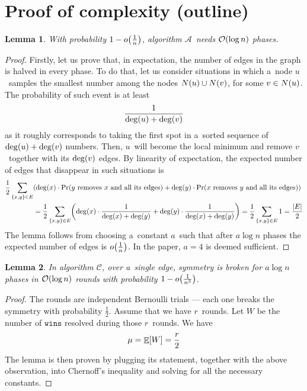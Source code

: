 \documentclass{article}
\newtheorem{lemma}{Lemma}
\DeclarePairedDelimiter{\parenthesesdelimiter}{(}{)}
\def\pars{\parenthesesdelimiter*}
\DeclarePairedDelimiter{\bracesdelimiter}{\{}{\}}
\def\braces{\bracesdelimiter*}
\let\set\braces
\DeclarePairedDelimiter{\bracketsdelimiter}{[}{]}
\def\brackets{\bracketsdelimiter*}
\DeclarePairedDelimiter{\lendelimiter}{|}{|}
\def\len{\lendelimiter*}
\DeclareMathOperator{\prob}{Pr}
\DeclareMathOperator{\expected}{\mathbb{E}}
\newcommand{\bigO}{\mathcal{O}}
\begin{document}
\section{Proof of complexity (outline)}
\begin{lemma}
\label{lemma:A:phases}
With probability \(1 - o\pars{\frac{1}{n}}\), algorithm \(\mathcal{A}\)~needs \(\bigO\pars{\log n}\) phases.
\end{lemma}
\begin{proof}
Firstly, let us prove that, in expectation, the number of edges in the graph is halved in every phase. To do that, let us consider situations in which a~node \(u\)~samples the smallest number among the nodes \(N\pars{u} \cup N\pars{v}\), for some \(v \in N\pars{u}\). The probability of such event is at least
\begin{equation*}
    \frac{1}{\deg\pars{u} + \deg\pars{v}}
\end{equation*}
as it roughly corresponds to taking the first spot in a~sorted sequence of \(\deg\pars{u} + \deg\pars{v}\) numbers. Then, \(u\)~will become the local minimum and remove \(v\)~together with its \(\deg\pars{v}\) edges. By linearity of expectation, the expected number of edges that disappear in such situations is
\begin{equation*}
    \begin{split}
        \frac{1}{2}\sum_{\set{x, y} \in E}&\pars{\deg\pars{x} \cdot \prob\pars{\text{\(y\) removes \(x\) and all its edges}} + \deg\pars{y} \cdot \prob\pars{\text{\(x\) removes \(y\) and all its edges}}}\\
            &= \frac{1}{2}\sum_{\set{x, y} \in E}\pars{\deg\pars{x} \cdot \frac{1}{\deg\pars{x} + \deg\pars{y}} + \deg\pars{y} \cdot \frac{1}{\deg\pars{x} + \deg\pars{y}}}
            = \frac{1}{2}\sum_{\set{x, y} \in E}1
            = \frac{\len{E}}{2}
    \end{split}
\end{equation*}
The lemma follows from choosing a~constant \(a\)~such that after \(a\log n\) phases the expected number of edges is \(o\pars{\frac{1}{n}}\). In the paper, \(a = 4\) is deemed sufficient.
\end{proof}
\begin{lemma}
\label{lemma:C:phases}
In algorithm \(\mathcal{C}\), over a~single edge, symmetry is broken for \(a\log n\) phases in \(\bigO\pars{\log n}\) rounds with probability \(1 - o\pars{\frac{1}{n^3}}\).
\end{lemma}
\begin{proof}
The rounds are independent Bernoulli trials --- each one breaks the symmetry with probability \(\frac{1}{2}\). Assume that we have \(r\)~rounds. Let \(W\) be the number of \(\texttt{wins}\) resolved during those \(r\)~rounds. We have
\begin{equation*}
    \mu = \expected\brackets{W} = \frac{r}{2}
\end{equation*}
The lemma is then proven by plugging its statement, together with the above observation, into Chernoff's inequality and solving for all the necessary constants.
\end{proof}
\end{document}
